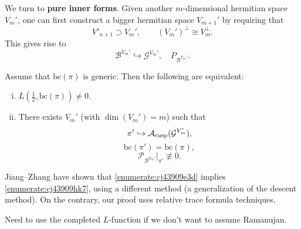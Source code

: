 \documentclass[reqno]{amsart} 
\begin{document}
We turn to \textbf{pure inner forms}.  Given another $m$-dimensional hermitian space $V_m '$, one can first construct a bigger hermitian space $V_{m + 1}'$ by requiring that
\begin{equation*}
V '_{n + 1} \supset V_m ', \qquad (V_m ')^\perp \cong V_m^\perp.
\end{equation*}
This gives rise to
\begin{equation*}
\mathcal{B}^{V_m '} \hookrightarrow \mathcal{G}^{V_m '}, \quad P_{\mathcal{B}^{V_m '}}.
\end{equation*}

\begin{theorem}\label{theorem:cj4394a13l}
  Assume that $\mathrm{bc}(\pi)$ is generic.  Then the following are equivalent:
  \begin{enumerate}[(i)]
  \item\label{enumerate:cj43909hk7} $L (\tfrac{1}{2}, \mathrm{bc} (\pi)) \neq 0$.
  \item\label{enumerate:cj43909e3d} There exists $V_m '$ (with $\dim (V_m ') = m$) such that
    \begin{equation*}
      \pi ' \hookrightarrow \mathcal{A}_{\operatorname{cusp}} (\mathcal{G}^{V_m '}),
    \end{equation*}
    \begin{equation*}
      \mathrm{bc} (\pi ') = \mathrm{bc} (\pi),
    \end{equation*}
    \begin{equation*}
      \mathcal{P}_{\mathcal{B}^{V_m '}} |_{\pi '} \not \equiv 0.
    \end{equation*}
  \end{enumerate}
\end{theorem}
\begin{remark}
  Jiang--Zhang have shown that \eqref{enumerate:cj43909e3d} implies \eqref{enumerate:cj43909hk7}, using a different method (a generalization of the descent method).  On the contrary, our proof uses relative trace formula techniques.
\end{remark}
\begin{remark}
  Need to use the completed $L$-function if we don't want to assume Ramanujan.
\end{remark}
\end{document}
